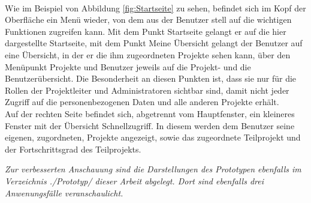 \\Wie im Beispiel von Abbildung \ref{fig:Startseite} zu sehen, befindet sich im Kopf der Oberfläche ein Menü wieder, von dem aus der Benutzer stell auf die wichtigen Funktionen zugreifen kann. Mit dem Punkt \glqq{}Startseite\grqq{} gelangt er auf die hier dargestellte Startseite, mit dem Punkt \glqq{}Meine Übersicht\grqq{} gelangt der Benutzer auf eine Übersicht, in der er die ihm zugeordneten Projekte sehen kann, über den Menüpunkt \glqq{}Projekte\grqq{} und \glqq{}Benutzer\grqq{} jeweils auf die Projekt- und die Benutzerübersicht. Die Besonderheit an diesen Punkten ist, dass sie nur für die Rollen der Projektleiter und Administratoren sichtbar sind, damit nicht jeder Zugriff auf die personenbezogenen Daten und alle anderen Projekte erhält.\\Auf der rechten Seite befindet sich, abgetrennt vom Hauptfenster, ein kleineres Fenster mit der Übersicht Schnellzugriff. In diesem werden dem Benutzer seine eigenen, zugordneten, Projekte angezeigt, sowie das zugeordnete Teilprojekt und der Fortschrittsgrad des Teilprojekts.

\emph{Zur verbesserten Anschauung sind die Darstellungen des Prototypen ebenfalls im Verzeichnis ./Prototyp/ dieser Arbeit abgelegt. Dort sind ebenfalls drei Anwenungsfälle veranschaulicht.}\\